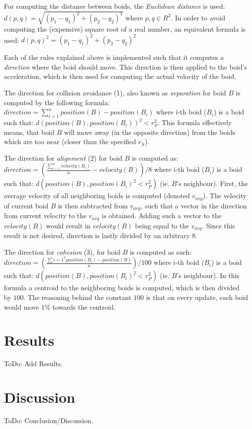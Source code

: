 \documentclass[9pt]{pnas-new}
\begin{document}
For computing the distance between boids, the {\em Euclidean distance} is used:
$ d(p, q) = \sqrt{(p_1-q_1)^2 + (p_2 - q_2)^2} $
where $p, q \in R^2$.
In order to avoid computing the (expensive) square root of a real number, an equivalent formula is used:
$ d(p, q)^2 = (p_1-q_1)^2 + (p_2 - q_2)^2 $

Each of the rules explained above is implemented such that it computes a {\em direction} where the boid should move.
This direction is then applied to the boid's acceleration, which is then used for computing the actual velocity of the boid.

The direction for collision avoidance (1), also known as {\em separation} for boid $B$ is computed by the following formula:
$direction = \sum_{i=1}^{n} position(B) - position(B_i) $
where i-th boid ($B_i$) is a boid such that: $ d(position(B), position(B_i))^2 < r_S^2 $.
This forumla effectively means, that boid $B$ will move away (in the opposite direction) from the boids which are too near (closer than the specified $r_S$).

The direction for {\em alignment} (2) for boid $B$ is computed as:
$direction = (\frac{\sum_{i=1}^{n} velocity(B_i)}{n} - velocity(B)) / 8 $
where i-th boid ($B_i$) is a boid such that: $ d(position(B), position(B_i)^2 < r_P^2) $ (ie. $B$'s neighbour).
First, the average velocity of all neighboring boids is computed (denoted $v_{avg}$).
The velocity of current boid $B$ is then subtracted from $v_{avg}$, such that a vector in the direction
from current velocity to the $v_{avg}$ is obtained.
Adding such a vector to the $velocity(B)$ would result in $velocity(B)$ being equal to the $v_{avg}$.
Since this result is not desired, direction is lastly divided by an arbitrary $8$.

The direction for {\em cohesion} (3), for boid $B$ is computed as such:
$direction = (\frac{\sum{i=1}^{n} position(B_i) - position(B)}{n}) / 100 $
where i-th boid ($B_i$) is a boid such that: $ d(position(B), position(B_i)^2 < r_P^2) $ (ie. $B$'s neighbour).
In this formula a centroid to the neighboring boids is computed, which is then divided by $100$.
The reasoning behind the constant $100$ is that on every update, each boid would move $1\%$ towards the centroid.

\section*{Results}
ToDo: Add Results.
\section*{Discussion}
ToDo: Conclusion/Discussion.
\showacknow %
\end{document}
